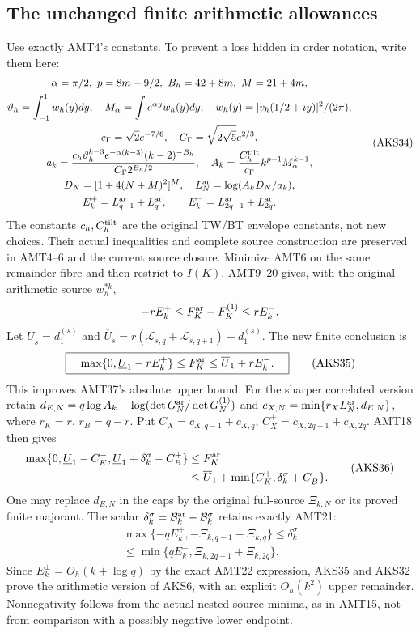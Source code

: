 \subsection{The unchanged finite arithmetic allowances}
Use exactly AMT4's constants. To prevent a loss hidden in order notation,
write them here:
\[
\begin{gathered}
 \alpha=\pi/2,\ p=8m-9/2,\ B_h=42+8m,\ M=21+4m,\\
 \vartheta_h=\int_{-1}^1w_h(y)dy,\quad
 M_\alpha=\int e^{\alpha y}w_h(y)dy,\quad
 w_h(y)=|v_h(1/2+iy)|^2/(2\pi),\\
 c_\Gamma=\sqrt2e^{-7/6},\quad C_\Gamma=\sqrt{2\sqrt5}e^{2/3},\\
 a_k=\frac{c_h\vartheta_h^{k-3}e^{-\alpha(k-3)}(k-2)^{-B_h}}
                    {C_\Gamma2^{B_h/2}},\quad
 A_k=\frac{C_h^{\rm tilt}}{c_\Gamma}k^{p+1}M_\alpha^{k-1},\\
 D_N=[1+4(N+M)^2]^M,\quad L_N^{\rm ar}=\log(A_kD_N/a_k),\\
 E_k^+=L_{q-1}^{\rm ar}+L_q^{\rm ar},\qquad
 E_k^-=L_{2q-1}^{\rm ar}+L_{2q}^{\rm ar}.
\end{gathered}\tag{AKS34}
\]
The constants $c_h,C_h^{\rm tilt}$ are the original TW/BT envelope
constants, not new choices. Their actual inequalities and complete
source construction are preserved in AMT4--6 and the current source
closure. Minimize AMT6 on the same remainder fibre and then restrict to
$I(K)$. AMT9--20 gives, with the original arithmetic source $w_h^{*k}$,
\[
 -rE_k^+\le F_K^{\rm ar}-F_K^{(1)}\le rE_k^-.
\]
Let $\underline U_s=d_1^{(s)}$ and
$\overline U_s=r(\mathcal L_{s,q}+\mathcal L_{s,q+1})-d_1^{(s)}$. The new finite conclusion is
\[
 \boxed{\quad
 \max\{0,\underline U_1-rE_k^+\}\le F_K^{\rm ar}
                  \le\overline U_1+rE_k^-.
 \quad}\tag{AKS35}
\]
This improves AMT37's absolute upper bound. For the sharper correlated
version retain $d_{E,N}=q\log A_k-
\log(\det G_N^{\rm ar}/\det G_N^{(1)})$ and
$c_{X,N}=\min\{r_XL_N^{\rm ar},d_{E,N}\}$, where $r_K=r$, $r_B=q-r$.
Put $C_X^-=c_{X,q-1}+c_{X,q}$,
$C_X^+=c_{X,2q-1}+c_{X,2q}$. AMT18 then gives
\[
\begin{split}
 \max\{0,\underline U_1-C_K^-,
                  \underline U_1+\delta_k^\sigma-C_B^+\}
 &\le F_K^{\rm ar}\\
 &\le\overline U_1+
            \min\{C_K^+,\delta_k^\sigma+C_B^-\}.
\end{split}\tag{AKS36}
\]
One may replace $d_{E,N}$ in the caps by the original full-source
$\Xi_{k,N}$ or its proved finite majorant. The scalar
$\delta_k^\sigma=\mathcal B_k^{\rm ar}-\mathcal B_k^\sigma$ retains
exactly AMT21:
\[
\begin{gathered}
 \max\{-qE_k^+,-\Xi_{k,q-1}-\Xi_{k,q}\}
       \le\delta_k^\sigma\\
       \le\min\{qE_k^-,\Xi_{k,2q-1}+\Xi_{k,2q}\}.
\end{gathered}\tag{AKS37}
\]
Since $E_k^\pm=O_h(k+\log q)$ by the exact AMT22 expression, AKS35 and
AKS32 prove the arithmetic version of AKS6, with an explicit
$O_h(k^2)$ upper remainder. Nonnegativity follows from the actual
nested source minima, as in AMT15, not from comparison with a possibly
negative lower endpoint.

